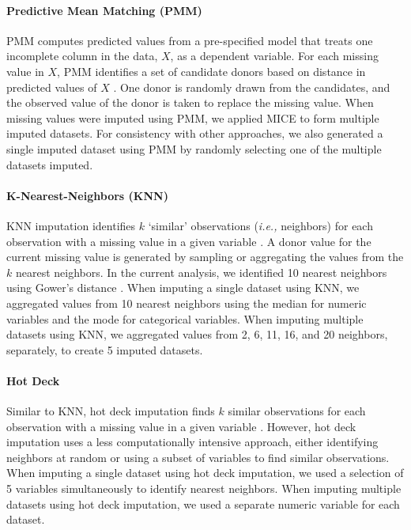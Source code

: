 \documentclass{article}
\begin{document}
\paragraph{Predictive Mean Matching (PMM)}

PMM computes predicted values from a pre-specified model that treats one
incomplete column in the data, \(X\), as a dependent variable. For each
missing value in \(X\), PMM identifies a set of candidate donors based
on distance in predicted values of \(X\) \cite{landerman1997empirical}.
One donor is randomly drawn from the candidates, and the observed value
of the donor is taken to replace the missing value. When missing values
were imputed using PMM, we applied MICE to form multiple imputed
datasets. For consistency with other approaches, we also generated a
single imputed dataset using PMM by randomly selecting one of the
multiple datasets imputed.

\paragraph{K-Nearest-Neighbors (KNN)}

KNN imputation identifies \(k\) `similar' observations
(\textit{i.e., }neighbors) for each observation with a missing value in
a given variable \cite{chen2000nearest}. A donor value for the current
missing value is generated by sampling or aggregating the values from
the \(k\) nearest neighbors. In the current analysis, we identified 10
nearest neighbors using Gower's distance \cite{gower}. When imputing a
single dataset using KNN, we aggregated values from 10 nearest neighbors
using the median for numeric variables and the mode for categorical
variables. When imputing multiple datasets using KNN, we aggregated
values from 2, 6, 11, 16, and 20 neighbors, separately, to create 5
imputed datasets.

\paragraph{Hot Deck}

Similar to KNN, hot deck imputation finds \(k\) similar observations for
each observation with a missing value in a given variable
\cite{andridge2010hotdeck}. However, hot deck imputation uses a less
computationally intensive approach, either identifying neighbors at
random or using a subset of variables to find similar observations. When
imputing a single dataset using hot deck imputation, we used a selection
of 5 variables simultaneously to identify nearest neighbors. When
imputing multiple datasets using hot deck imputation, we used a separate
numeric variable for each dataset.
\end{document}

